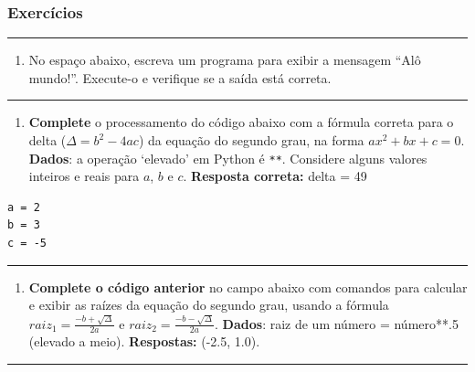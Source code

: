 \documentclass[12pt,a4paper]{article}
\providecommand{\tightlist}{%
      \setlength{\itemsep}{0pt}\setlength{\parskip}{0pt}}
\begin{document}
    \hypertarget{exercuxedcios}{%
\subsubsection{Exercícios}\label{exercuxedcios}}

    \begin{center}\rule{0.5\linewidth}{0.5pt}\end{center}

\begin{enumerate}
\def\labelenumi{\arabic{enumi}.}
\tightlist
\item
  No espaço abaixo, escreva um programa para exibir a mensagem ``Alô
  mundo!''. Execute-o e verifique se a saída está correta.
\end{enumerate}

    \begin{center}\rule{0.5\linewidth}{0.5pt}\end{center}

\begin{enumerate}
\def\labelenumi{\arabic{enumi}.}
\setcounter{enumi}{1}
\tightlist
\item
  \textbf{Complete} o processamento do código abaixo com a fórmula
  correta para o delta (\(\Delta = b^2-4ac\)) da equação do segundo
  grau, na forma \(ax^{2}+bx+c=0\). \textbf{Dados}: a operação `elevado'
  em Python é \texttt{**}. Considere alguns valores inteiros e reais
  para \(a\), \(b\) e \(c\). \textbf{Resposta correta:} delta = 49
\end{enumerate}

\begin{verbatim}
a = 2
b = 3
c = -5
\end{verbatim}

    \begin{center}\rule{0.5\linewidth}{0.5pt}\end{center}

\begin{enumerate}
\def\labelenumi{\arabic{enumi}.}
\setcounter{enumi}{2}
\tightlist
\item
  \textbf{Complete o código anterior} no campo abaixo com comandos para
  calcular e exibir as raízes da equação do segundo grau, usando a
  fórmula \(raiz_1=\frac{-b+\sqrt{\Delta}}{2a}\) e
  \(raiz_2=\frac{-b-\sqrt{\Delta}}{2a}\). \textbf{Dados}: raiz de um
  número = número**.5 (elevado a meio). \textbf{Respostas:} (-2.5, 1.0).
\end{enumerate}

    \begin{center}\rule{0.5\linewidth}{0.5pt}\end{center}
\end{document}
